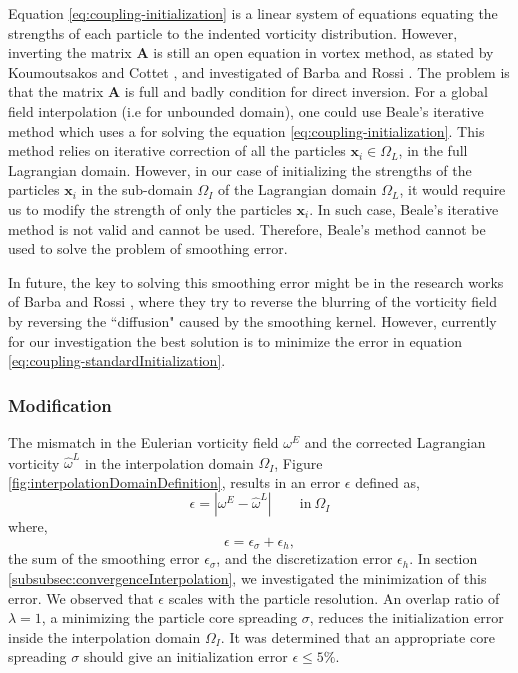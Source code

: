 	Equation \ref{eq:coupling-initialization} is a linear system of equations equating the strengths of each particle to the indented vorticity distribution. However, inverting the matrix $\mathbf{A}$ is still an open equation in vortex method, as stated by Koumoutsakos and Cottet \cite{Cottet2000a}, and investigated of Barba and Rossi \cite{Barba2010a}. The problem is that the matrix $\mathbf{A}$ is full and badly condition for direct inversion. For a global field interpolation (i.e for unbounded domain), one could use Beale's iterative method which uses a  for solving the equation \ref{eq:coupling-initialization}. This method relies on iterative correction of all the particles $\mathbf{x}_i \in \Omega_L$, in the full Lagrangian domain. However, in our case of initializing the strengths of the particles $\mathbf{x}_i$ in the sub-domain $\Omega_{I}$ of the Lagrangian domain $\Omega_L$, it would require us to modify the strength of only the particles $\mathbf{x}_i$. In such case, Beale's iterative method is not valid and cannot be used. Therefore, Beale's method cannot be used to solve the problem of smoothing error.

	In future, the key to solving this smoothing error might be in the research works of Barba and Rossi \cite{Barba2010a}, where they try to reverse the blurring of the vorticity field by reversing the ``diffusion" caused by the smoothing kernel. However, currently for our investigation the best solution is to minimize the error in equation \ref{eq:coupling-standardInitialization}.

	\subsubsection*{Modification}

	The mismatch in the Eulerian vorticity field $\omega^E$ and the corrected Lagrangian vorticity $\hat{\omega}^L$ in the interpolation domain $\Omega_I$, Figure \ref{fig:interpolationDomainDefinition}, results in an error $\epsilon$ defined as,
			\begin{equation}
			\epsilon = |\omega^E - \hat{\omega}^L| \qquad \mathrm{in}\ \Omega_I
			\label{eq:coupling-errorDefinition}
			\end{equation}
	where,
			\begin{equation}
			\epsilon = \epsilon_{\sigma} + \epsilon_h,
			\label{eq:coupling-totalError}
			\end{equation}
	the sum of the smoothing error $\epsilon_{\sigma}$, and the discretization error $\epsilon_h$. In section \ref{subsubsec:convergenceInterpolation}, we investigated the minimization of this error. We observed that $\epsilon$ scales with the particle resolution. An overlap ratio of $\lambda=1$, a minimizing the particle core spreading $\sigma$, reduces the initialization error inside the interpolation domain $\Omega_I$. It was determined that an appropriate core spreading $\sigma$ should give an initialization error $\epsilon\leqslant5\%$.
	

